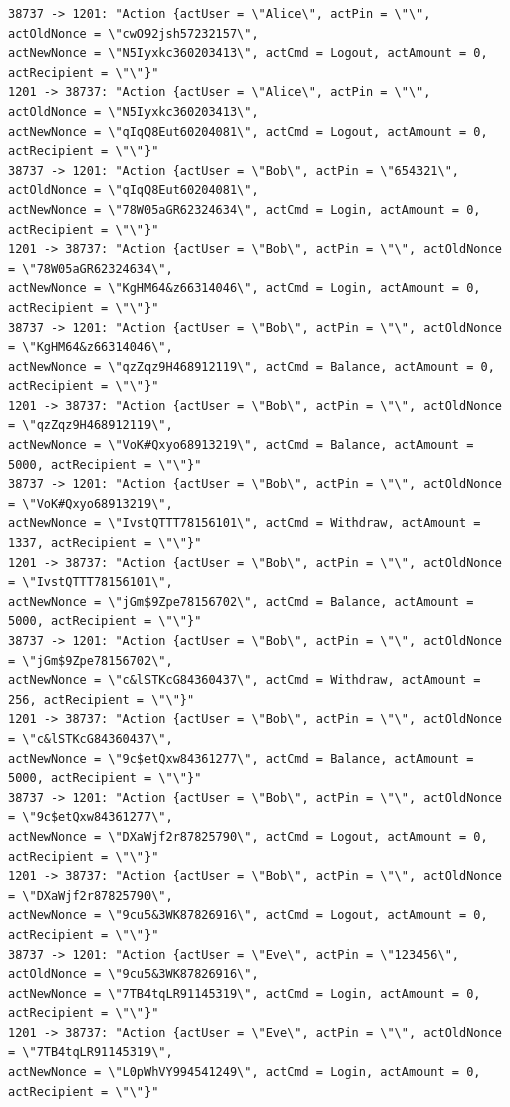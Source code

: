 \documentclass[12pt]{article}
\begin{document}
\begin{Verbatim}[frame=single,fontsize=\scriptsize]
38737 -> 1201: "Action {actUser = \"Alice\", actPin = \"\", actOldNonce = \"cwO92jsh57232157\", 
actNewNonce = \"N5Iyxkc360203413\", actCmd = Logout, actAmount = 0, actRecipient = \"\"}"
1201 -> 38737: "Action {actUser = \"Alice\", actPin = \"\", actOldNonce = \"N5Iyxkc360203413\", 
actNewNonce = \"qIqQ8Eut60204081\", actCmd = Logout, actAmount = 0, actRecipient = \"\"}"
38737 -> 1201: "Action {actUser = \"Bob\", actPin = \"654321\", actOldNonce = \"qIqQ8Eut60204081\", 
actNewNonce = \"78W05aGR62324634\", actCmd = Login, actAmount = 0, actRecipient = \"\"}"
1201 -> 38737: "Action {actUser = \"Bob\", actPin = \"\", actOldNonce = \"78W05aGR62324634\", 
actNewNonce = \"KgHM64&z66314046\", actCmd = Login, actAmount = 0, actRecipient = \"\"}"
38737 -> 1201: "Action {actUser = \"Bob\", actPin = \"\", actOldNonce = \"KgHM64&z66314046\", 
actNewNonce = \"qzZqz9H468912119\", actCmd = Balance, actAmount = 0, actRecipient = \"\"}"
1201 -> 38737: "Action {actUser = \"Bob\", actPin = \"\", actOldNonce = \"qzZqz9H468912119\", 
actNewNonce = \"VoK#Qxyo68913219\", actCmd = Balance, actAmount = 5000, actRecipient = \"\"}"
38737 -> 1201: "Action {actUser = \"Bob\", actPin = \"\", actOldNonce = \"VoK#Qxyo68913219\", 
actNewNonce = \"IvstQTTT78156101\", actCmd = Withdraw, actAmount = 1337, actRecipient = \"\"}"
1201 -> 38737: "Action {actUser = \"Bob\", actPin = \"\", actOldNonce = \"IvstQTTT78156101\", 
actNewNonce = \"jGm$9Zpe78156702\", actCmd = Balance, actAmount = 5000, actRecipient = \"\"}"
38737 -> 1201: "Action {actUser = \"Bob\", actPin = \"\", actOldNonce = \"jGm$9Zpe78156702\", 
actNewNonce = \"c&lSTKcG84360437\", actCmd = Withdraw, actAmount = 256, actRecipient = \"\"}"
1201 -> 38737: "Action {actUser = \"Bob\", actPin = \"\", actOldNonce = \"c&lSTKcG84360437\", 
actNewNonce = \"9c$etQxw84361277\", actCmd = Balance, actAmount = 5000, actRecipient = \"\"}"
38737 -> 1201: "Action {actUser = \"Bob\", actPin = \"\", actOldNonce = \"9c$etQxw84361277\", 
actNewNonce = \"DXaWjf2r87825790\", actCmd = Logout, actAmount = 0, actRecipient = \"\"}"
1201 -> 38737: "Action {actUser = \"Bob\", actPin = \"\", actOldNonce = \"DXaWjf2r87825790\", 
actNewNonce = \"9cu5&3WK87826916\", actCmd = Logout, actAmount = 0, actRecipient = \"\"}"
38737 -> 1201: "Action {actUser = \"Eve\", actPin = \"123456\", actOldNonce = \"9cu5&3WK87826916\", 
actNewNonce = \"7TB4tqLR91145319\", actCmd = Login, actAmount = 0, actRecipient = \"\"}"
1201 -> 38737: "Action {actUser = \"Eve\", actPin = \"\", actOldNonce = \"7TB4tqLR91145319\", 
actNewNonce = \"L0pWhVY994541249\", actCmd = Login, actAmount = 0, actRecipient = \"\"}"

\end{Verbatim}
\end{document}
